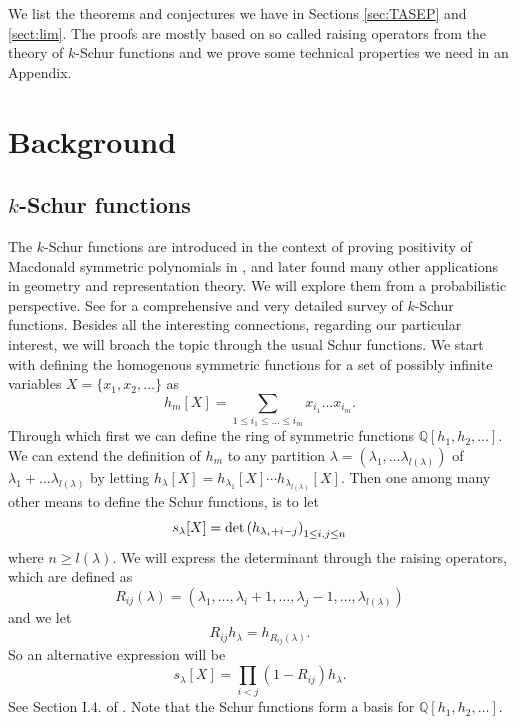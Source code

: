 \documentclass[11pt]{amsart}
\newcommand{\tn}[1]{\textnormal{#1}}
\begin{document}
We list the theorems and conjectures we have in Sections \ref{sec:TASEP} and \ref{sect:lim}. The proofs are mostly based on so called raising operators from the theory of $k$-Schur functions and we prove some technical properties we need in an Appendix.

\section{Background}

\subsection{$k$-Schur functions}
The $k$-Schur functions are introduced in the context of proving positivity of Macdonald symmetric polynomials in \cite{LLM03}, 
and later found many other applications in geometry and representation theory. We will explore them from a probabilistic perspective.
See \cite{LLMSSZ14} for a comprehensive and very detailed survey of $k$-Schur functions. Besides all the interesting connections, regarding our particular interest, we will broach the topic through the usual Schur functions. 
We start with defining the homogenous symmetric functions for a set of possibly infinite variables 
$X=\{x_1,x_2, \ldots\}$ as
\[h_m[X]=\sum_{1 \leq i_1 \leq \ldots \leq i_m} x_{i_1}\ldots x_{i_m}.\]
Through which first we can define the ring of symmetric functions $\mathbb{Q}[h_1,h_2,\ldots]$.
We can extend the definition of $h_m$ to any partition $\lambda=(\lambda_1,\ldots \lambda_{l(\lambda)})$ of $\lambda_1+\ldots \lambda_{l(\lambda)}$ by letting  
$h_{\lambda}[X]=h_{\lambda_1}[X]\cdots h_{\lambda_{l(\lambda)}}[X].$ 
 Then one among many other means to define the Schur functions, is to let 
 \[s_{\lambda}[X]=\tn{det}\left(h_{\lambda_{i}+i-j} \right)_{1\leq i,j \leq n}\]
where $n \geq l(\lambda).$ We will express the determinant through the raising operators, which are defined as
\begin{equation} \label{raising}
R_{ij}(\lambda)=(\lambda_1,\ldots,\lambda_i+1,\ldots,\lambda_j-1,\ldots,\lambda_{l(\lambda)})    
\end{equation}
and we let
\begin{equation} \label{opext}
    R_{ij}h_{\lambda}=h_{R_{ij}(\lambda)}.
\end{equation}
So an alternative expression will be 
\[s_{\lambda}[X]=\prod_{i <j} (1-R_{ij}) h_{\lambda}.\]
 See Section I.4. of \cite{M98}. Note that the Schur functions form a basis for $\mathbb{Q}[h_1,h_2,\ldots].$ 
 
\end{document}
